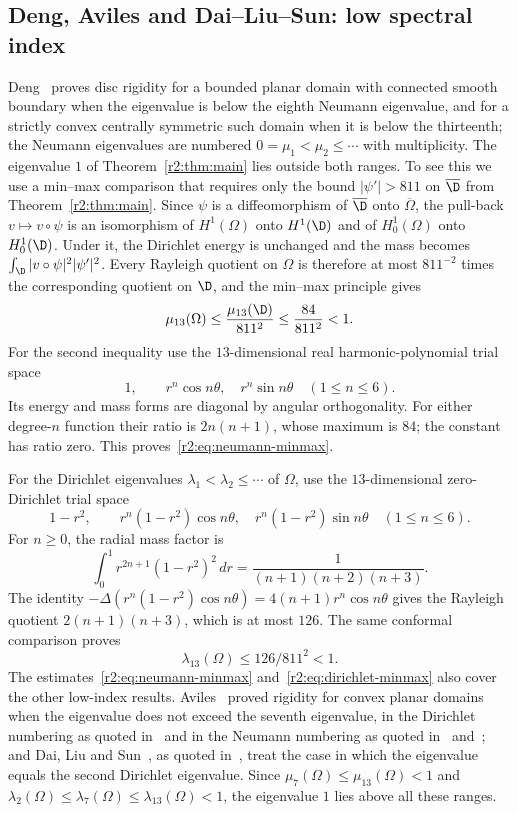 \subsection{Deng, Aviles and Dai--Liu--Sun: low spectral index}
Deng~\cite{Den12} proves disc rigidity for a bounded planar domain with connected smooth boundary when the eigenvalue is below the eighth Neumann eigenvalue, and for a strictly convex centrally symmetric such domain when it is below the thirteenth; the Neumann eigenvalues are numbered $0=\mu_1<\mu_2\le\cdots$ with multiplicity. The eigenvalue $1$ of Theorem~\ref{r2:thm:main} lies outside both ranges. To see this we use a min--max comparison that requires only the bound $|\psi'|>811$ on $\overline\D$ from Theorem~\ref{r2:thm:main}. Since $\psi$ is a diffeomorphism of $\overline\D$ onto $\overline\Omega$, the pull-back $v\mapsto v\circ\psi$ is an isomorphism of $H^1(\Omega)$ onto $H^1(\D)$ and of $H^1_0(\Omega)$ onto $H^1_0(\D)$. Under it, the Dirichlet energy is unchanged and the mass becomes $\int_\D|v\circ\psi|^2|\psi'|^2$. Every Rayleigh quotient on $\Omega$ is therefore at most $811^{-2}$ times the corresponding quotient on $\D$, and the min--max principle gives
\begin{equation}\label{r2:eq:neumann-minmax}
 \mu_{13}(\Omega)\le\frac{\mu_{13}(\D)}{811^2}
 \le\frac{84}{811^2}<1.
\end{equation}
For the second inequality use the $13$-dimensional real harmonic-polynomial trial space
\[
 1,\qquad r^n\cos n\theta,\quad r^n\sin n\theta\quad(1\le n\le6).
\]
Its energy and mass forms are diagonal by angular orthogonality. For either degree-$n$ function their ratio is $2n(n+1)$, whose maximum is $84$; the constant has ratio zero. This proves~\eqref{r2:eq:neumann-minmax}.

For the Dirichlet eigenvalues $\lambda_1<\lambda_2\le\cdots$ of $\Omega$, use the $13$-dimensional zero-Dirichlet trial space
\[
 1-r^2,\qquad r^n(1-r^2)\cos n\theta,
 \quad r^n(1-r^2)\sin n\theta\quad(1\le n\le6).
\]
For $n\ge0$, the radial mass factor is
\[
 \int_0^1r^{2n+1}(1-r^2)^2\,dr
 =\frac1{(n+1)(n+2)(n+3)}.
\]
The identity $-\Delta(r^n(1-r^2)\cos n\theta)=4(n+1)r^n\cos n\theta$ gives the Rayleigh quotient $2(n+1)(n+3)$, which is at most $126$. The same conformal comparison proves
\begin{equation}\label{r2:eq:dirichlet-minmax}
 \lambda_{13}(\Omega)\le126/811^2<1.
\end{equation}
The estimates~\eqref{r2:eq:neumann-minmax} and~\eqref{r2:eq:dirichlet-minmax} also cover the other low-index results. Aviles~\cite{Avi86} proved rigidity for convex planar domains when the eigenvalue does not exceed the seventh eigenvalue, in the Dirichlet numbering as quoted in~\cite[\S0]{BY87} and in the Neumann numbering as quoted in~\cite[\S1]{Den12} and~\cite[(1.4.2)]{Kob93}; and Dai, Liu and Sun~\cite{DLS26}, as quoted in~\cite[\S1]{DSWZ25}, treat the case in which the eigenvalue equals the second Dirichlet eigenvalue. Since $\mu_7(\Omega)\le\mu_{13}(\Omega)<1$ and $\lambda_2(\Omega)\le\lambda_7(\Omega)\le\lambda_{13}(\Omega)<1$, the eigenvalue $1$ lies above all these ranges.


